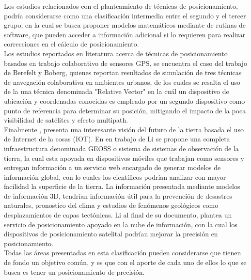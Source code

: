 Los estudios relacionados con el planteamiento de técnicas de posicionamiento, podría considerarse como una clasificación intermedia entre el segundo y el tercer grupo, en la cual se busca proponer modelos matemáticos mediante de rutinas de software, que pueden acceder a información adicional si lo requieren para realizar correcciones en el cálculo de posicionamiento.\\

Los estudios reportados en literatura acerca de técnicas de posicionamiento basados en trabajo colaborativo de sensores GPS, se encuentra el caso del trabajo de Berefelt y Boberg\cite{berefelt2004collaborative}, quienes reportan resultados de simulación de tres técnicas de navegación colaborativa en ambientes urbanos, de los cuales se resalta el uso de la una técnica denominada "Relative Vector" en la cuál un dispositivo de ubicación y coordenadas conocidas es empleado por un segundo dispositivo como punto de referencia para determinar su posición, mitigando el impacto de la poca visibilidad de satélites y efecto multipath.\\

Finalmente \cite{Li_2014}, presenta una interesante visión del futuro de la tierra basada el uso de Internet de la cosas (IOT). En en trabajo de Li se propone una completa infraestructura denominada GEOSS o sistema de sistemas de observación de la tierra, la cual esta apoyada en dispositivos móviles que trabajan como sensores y entregan información a un servicio web encargado de  generar modelos de información global, con lo cuales los científicos podrían analizar con mayor facilidad la superficie de la tierra. La información presentada mediante modelos de información 3D, tendrían información útil para la prevención de desastres naturales, pronostico del clima y estudios de fenómenos geológicos como desplazamientos de capas tectónicas. Li al final de su documento, plantea un servicio de posicionamiento apoyado en la nube de información, con la cual los dispositivos de posicionamiento satelital podrían mejorar la precisión en posicionamiento.\\  

Todas las áreas presentadas en esta clasificación pueden considerarse que tienen de fondo un objetivo común, y es que con el aporte de cada uno de ellos lo que se busca es tener un posicionamiento de precisión. \\





